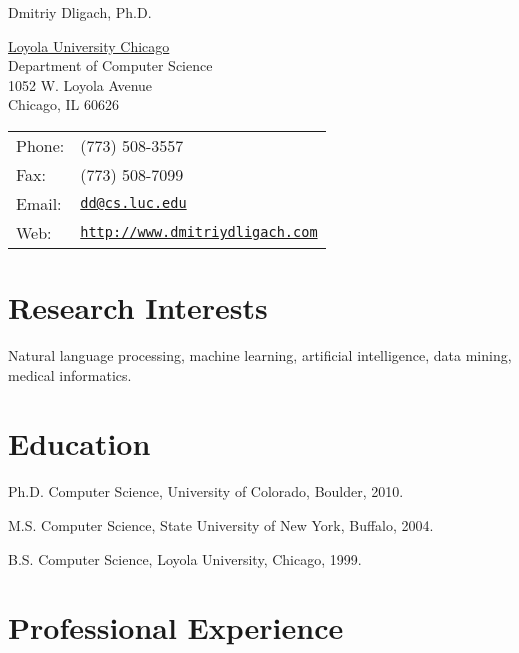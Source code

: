 \documentclass[letterpaper]{article}
\def\name{Dmitriy Dligach, Ph.D.}
\renewenvironment{itemize}{
  \begin{list}{}{
    \setlength{\leftmargin}{1.5em}
  }
}{
  \end{list}
}
\begin{document}
{\huge \name}

\vspace{0.25in}

\begin{minipage}{0.45\linewidth}
\href{http://www.luc.edu}{Loyola University Chicago} \\
Department of Computer Science \\
1052 W. Loyola Avenue \\
Chicago, IL 60626
\end{minipage}
\begin{minipage}{0.45\linewidth}
\begin{tabular}{ll}
Phone: & (773) 508-3557\\
Fax: &  (773) 508-7099 \\
Email: & \href{mailto:dd at cs.luc.edu}{\tt dd@cs.luc.edu} \\
Web: & \href{http://www.dmitriydligach.com}{\tt http://www.dmitriydligach.com} \\
\end{tabular}
\end{minipage}

\section*{Research Interests}

Natural language processing, machine learning, artificial intelligence, data mining, medical informatics.

\section*{Education}

\begin{itemize}
\item Ph.D. Computer Science, University of Colorado, Boulder, 2010.
\item M.S. Computer Science, State University of New York, Buffalo, 2004.
\item B.S. Computer Science, Loyola University, Chicago, 1999.
\end{itemize}

\section*{Professional Experience}
\end{document}

